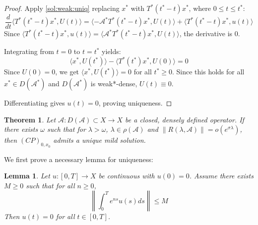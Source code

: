 \documentclass[12pt, oneside]{book}
\newtheorem{lemma}{Lemma}[section]
\newtheorem{theo}{Theorem}[section]
\newcommand{\norm}[1]{\left\lVert#1\right\rVert}
\newcommand{\A}{\mathscr{A}}
\begin{document}
\begin{proof}
Apply \eqref{sol:weak:uniq} replacing $x^*$ with $T^*(t^* - t)x^*$, where $0 \le t \le t^*$: 
$$ \frac{d}{dt} \langle T^*(t^* - t)x^*, U(t) \rangle = \langle -\A^* T^*(t^* - t)x^*, U(t) \rangle + \langle T^*(t^* - t)x^*, u(t) \rangle $$ 
Since $\langle T^*(t^* - t)x^*, u(t) \rangle = \langle \A^* T^*(t^* - t)x^*, U(t) \rangle$, the derivative is $0$. 

Integrating from $t=0$ to $t=t^*$ yields:
$$
\langle x^*, U(t^*) \rangle - \langle T^*(t^*)x^*, U(0) \rangle = 0
$$
Since $U(0) = 0$, we get $\langle x^*, U(t^*) \rangle = 0$ for all $t^* \ge 0$. Since this holds for all $x^* \in D(\A^*)$ and $D(\A^*)$ is weak*-dense, $U(t) \equiv 0$.

Differentiating gives $u(t) = 0$, proving uniqueness. 
\end{proof}

\begin{theo} \label{sol:mild}
	Let $\A: D(\A) \subset X \rightarrow X$ be a closed, densely defined operator. If there exists $\omega$ such that for $\lambda > \omega$, $\lambda \in \rho(\A)$ and $\norm{R(\lambda, \A)} = o(e^{\sigma \lambda})$, 
then $(CP)_{0,x_0}$ admits a unique mild solution. 
\end{theo}

We first prove a necessary lemma for uniqueness:
\begin{lemma} \label{sol:mild:uniq:lemma}
Let $u: [0, T] \rightarrow X$ be continuous with $u(0)=0$. Assume there exists $M \ge 0$ such that for all $n \ge 0$,
$$
\norm{\int_0^T e^{ns} u(s) ds} \le M
$$
Then $u(t) = 0$ for all $t \in [0, T]$. 
\end{lemma}
\end{document}
